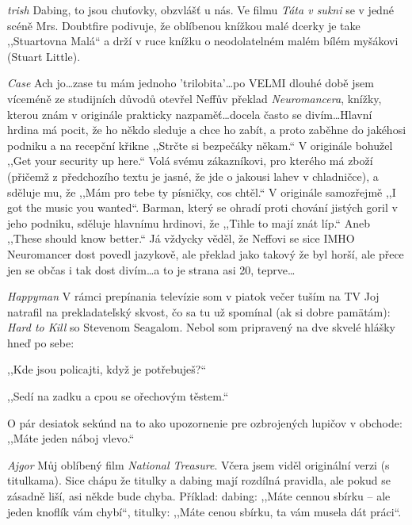 \medskip

\noindent
\textit{trish } Dabing, to jsou chuťovky, obzvlášť u nás. Ve filmu \textit{Táta v sukni} se v jedné scéně Mrs. Doubtfire podivuje, že oblíbenou knížkou malé dcerky je take ,,Stuartovna Malá`` a drží v ruce knížku o neodolatelném malém bílém myšákovi (Stuart Little).

\medskip

\noindent
\textit{Case} Ach jo\ldots zase tu mám jednoho 'trilobita'\ldots po VELMI dlouhé době jsem víceméně ze studijních důvodů otevřel Neffův překlad \textit{Neuromancera}, knížky, kterou znám v originále prakticky nazpaměť\ldots docela často se divím\ldots Hlavní hrdina má pocit, že ho někdo sleduje a chce ho zabít, a proto zaběhne do jakéhosi podniku a na recepční křikne ,,Strčte si bezpečáky někam.`` V originále bohužel ,,Get your security up here.`` Volá svému zákazníkovi, pro kterého má zboží (přičemž z předchozího textu je jasné, že jde o jakousi lahev v chladničce), a sděluje mu, že ,,Mám pro tebe ty písničky, cos chtěl.`` V originále samozřejmě ,,I got the music you wanted``. Barman, který se ohradí proti chování jistých goril v jeho podniku, sděluje hlavnímu hrdinovi, že ,,Tihle to mají znát líp.`` Aneb ,,These should know better.`` Já vždycky věděl, že Neffovi se sice IMHO Neuromancer dost povedl jazykově, ale překlad jako takový že byl horší, ale přece jen se občas i tak dost divím\ldots a to je strana asi 20, teprve\ldots

\medskip

\noindent
\textit{Happyman} V rámci prepínania televízie som v piatok večer tuším na TV Joj natrafil na prekladateľský skvost, čo sa tu už spomínal (ak si dobre pamätám): \textit{Hard to Kill} so Stevenom Seagalom. Nebol som pripravený na dve skvelé hlášky hneď po sebe: 

\noindent
,,Kde jsou policajti, když je potřebuješ?`` 

\noindent
,,Sedí na zadku a cpou se ořechovým těstem.``

\noindent
O pár desiatok sekúnd na to ako upozornenie pre ozbrojených lupičov v obchode: ,,Máte jeden náboj vlevo.``

\medskip

\noindent
\textit{Ajgor} Můj oblíbený film \textit{National Treasure}. Včera jsem viděl originální verzi (s titulkama). Sice chápu že titulky a dabing mají rozdílná pravidla, ale pokud se zásadně liší, asi někde bude chyba. Příklad: dabing: ,,Máte cennou sbírku -- ale jeden knoflík vám chybí``, titulky: ,,Máte cenou sbírku, ta vám musela dát práci``.

